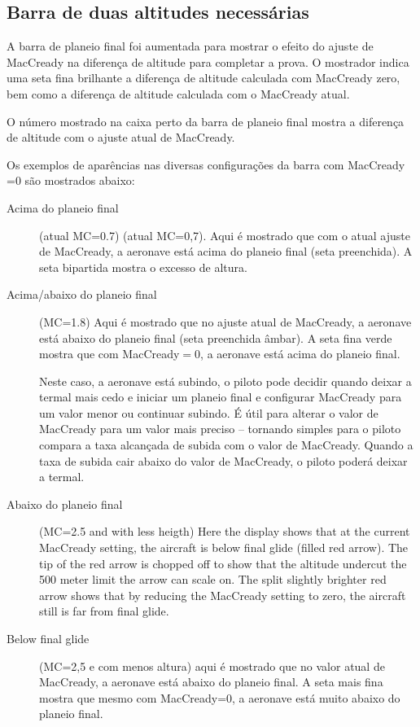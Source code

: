 \subsection*{Barra de duas altitudes necessárias}

A barra de planeio final foi aumentada para mostrar o efeito do ajuste de MacCready na diferença de altitude para completar a prova.  O mostrador indica uma seta fina brilhante a diferença de altitude calculada com MacCready zero, bem como a diferença de altitude calculada com o MacCready atual.  

O número mostrado na caixa perto da barra de planeio final mostra a diferença de altitude com o ajuste atual de MacCready.

Os exemplos de aparências nas diversas configurações da barra com MacCready =0 são mostrados abaixo:

\begin{description}
\item[Acima do planeio final] (atual MC=0.7)
 (atual MC=0,7).  Aqui é mostrado que com o atual ajuste de MacCready, a aeronave está acima do planeio final (seta preenchida).  A seta bipartida mostra o excesso de altura.

\item[Acima/abaixo do planeio final] (MC=1.8)
  Aqui é mostrado que no ajuste atual de MacCready, a aeronave está abaixo do planeio final (seta preenchida âmbar).  A seta fina verde mostra que com MacCready$=0$, a aeronave está acima do planeio final. 

 Neste caso, a aeronave está subindo, o piloto pode decidir quando deixar a termal mais cedo e iniciar um planeio final e configurar MacCready para um valor menor ou continuar subindo.  É útil para alterar o valor de MacCready para um valor mais preciso – tornando simples para o piloto compara a taxa alcançada de subida com o valor de MacCready.  Quando a taxa de subida cair abaixo do valor de MacCready, o piloto poderá deixar a termal.

\item[Abaixo do planeio final] (MC=2.5 and with less heigth)
  Here the display shows that at the current MacCready setting, the aircraft
  is below final glide (filled red arrow).  The tip of the red arrow is chopped off
  to show that the altitude undercut the 500 meter limit the arrow can scale on.
  The split slightly brighter red arrow shows that by reducing the MacCready 
  setting to zero, the aircraft still is far from final glide.

\item[Below final glide] 
 (MC=2,5 e com menos altura) aqui é mostrado que no valor atual de MacCready, a aeronave está abaixo do planeio final.  A seta mais fina
 mostra que mesmo com MacCready=0, a aeronave está muito abaixo do planeio final.
\end{description}


